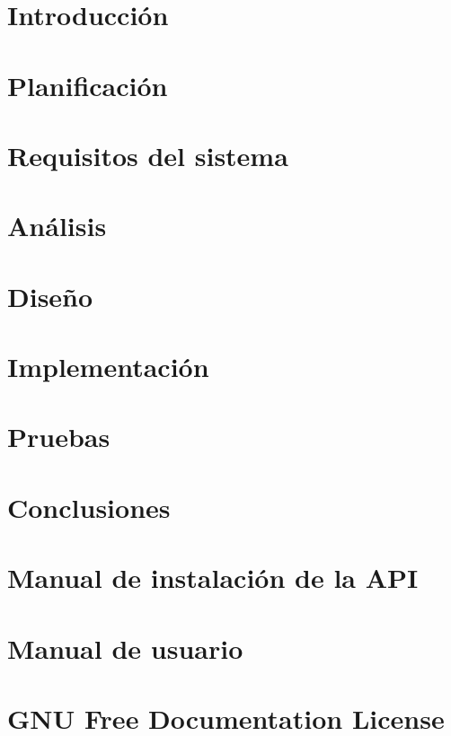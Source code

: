 \documentclass[a4paper, 12pt]{book}
\begin{document}


\tableofcontents
\listoffigures
\listoftables

\chapter{Introducción}
\label{chap:introduccion}


\chapter{Planificación}
\label{chap:calendario}


\chapter{Requisitos del sistema}
\label{chap:requisitos}


\chapter{Análisis}
\label{chap:analisis}


\chapter{Diseño}
\label{chap:diseno}


\chapter{Implementación}
\label{chap:implementacion}


\chapter{Pruebas}
\label{chap:pruebas}


\chapter{Conclusiones}
\label{chap:conclusiones}


\appendix

\chapter{Manual de instalación de la API}
\label{chap:manual_instalación}


\chapter{Manual de usuario}
\label{chap:manual_usuario}


\chapter{GNU Free Documentation License}
\label{sec:fdl}




\end{document}
